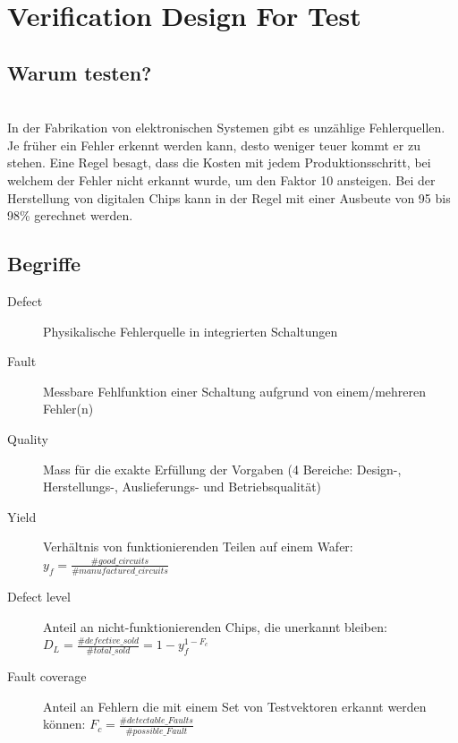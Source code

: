 \section{Verification Design For Test}
\subsection{Warum testen?}$~$ \\
In der Fabrikation von elektronischen Systemen gibt es unzählige Fehlerquellen. Je früher ein Fehler erkennt werden kann, desto weniger teuer kommt er zu stehen. Eine Regel besagt, dass die Kosten mit jedem Produktionsschritt, bei welchem der Fehler nicht erkannt wurde, um den Faktor 10 ansteigen. Bei der Herstellung von digitalen Chips kann in der Regel mit einer Ausbeute von 95 bis 98\% gerechnet werden.

\subsection{Begriffe}
\begin{description}
  \item[Defect] Physikalische Fehlerquelle in integrierten Schaltungen
  \item[Fault] Messbare Fehlfunktion einer Schaltung aufgrund von einem/mehreren Fehler(n)
  \item[Quality] Mass für die exakte Erfüllung der Vorgaben (4 Bereiche: Design-, Herstellungs-, Auslieferungs- und Betriebsqualität)
  \item[Yield] Verhältnis von funktionierenden Teilen auf einem Wafer: $y_f = \frac{\#good\_circuits}{\#manufactured\_circuits}$
  \item[Defect level] Anteil an nicht-funktionierenden Chips, die unerkannt bleiben: $D_L = \frac{\#defective\_sold}{\#total\_sold} = 1 - y_f^{1-F_c}$
  \item[Fault coverage] Anteil an Fehlern die mit einem Set von Testvektoren erkannt werden können: $F_c = \frac{\#detectable\_Faults}{\#possible\_Fault}$
\end{description}



